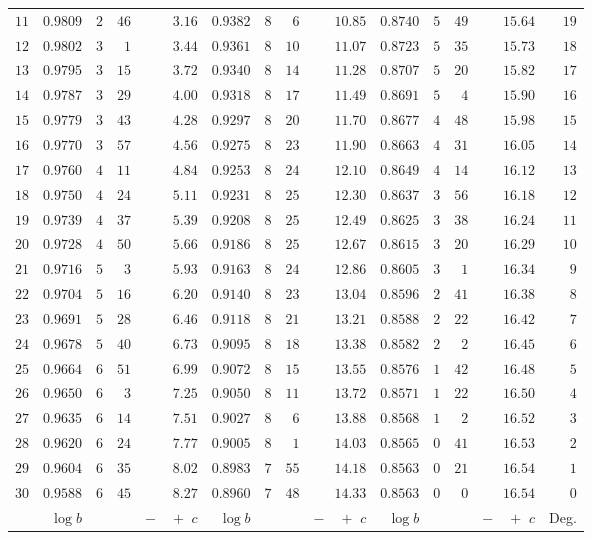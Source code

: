 \begin{center}
\begin{tabular}{r||r|rr|r||r|rr|r||r|rr|r||r}
$11$&$0.9809$&$2$&$46$&$3.16$&$0.9382$&$8$&$6$&$10.85$&$0.8740$&$5$&$49$&$15.64$&$19$\\
$12$&$0.9802$&$3$&$1$&$3.44$&$0.9361$&$8$&$10$&$11.07$&$0.8723$&$5$&$35$&$15.73$&$18$\\
$13$&$0.9795$&$3$&$15$&$3.72$&$0.9340$&$8$&$14$&$11.28$&$0.8707$&$5$&$20$&$15.82$&$17$\\
$14$&$0.9787$&$3$&$29$&$4.00$&$0.9318$&$8$&$17$&$11.49$&$0.8691$&$5$&$4$&$15.90$&$16$\\
$15$&$0.9779$&$3$&$43$&$4.28$&$0.9297$&$8$&$20$&$11.70$&$0.8677$&$4$&$48$&$15.98$&$15$\\[3pt]
$16$&$0.9770$&$3$&$57$&$4.56$&$0.9275$&$8$&$23$&$11.90$&$0.8663$&$4$&$31$&$16.05$&$14$\\
$17$&$0.9760$&$4$&$11$&$4.84$&$0.9253$&$8$&$24$&$12.10$&$0.8649$&$4$&$14$&$16.12$&$13$\\
$18$&$0.9750$&$4$&$24$&$5.11$&$0.9231$&$8$&$25$&$12.30$&$0.8637$&$3$&$56$&$16.18$&$12$\\
$19$&$0.9739$&$4$&$37$&$5.39$&$0.9208$&$8$&$25$&$12.49$&$0.8625$&$3$&$38$&$16.24$&$11$\\
$20$&$0.9728$&$4$&$50$&$5.66$&$0.9186$&$8$&$25$&$12.67$&$0.8615$&$3$&$20$&$16.29$&$10$\\[3pt]
$21$&$0.9716$&$5$&$3$&$5.93$&$0.9163$&$8$&$24$&$12.86$&$0.8605$&$3$&$1$&$16.34$&$9$\\
$22$&$0.9704$&$5$&$16$&$6.20$&$0.9140$&$8$&$23$&$13.04$&$0.8596$&$2$&$41$&$16.38$&$8$\\
$23$&$0.9691$&$5$&$28$&$6.46$&$0.9118$&$8$&$21$&$13.21$&$0.8588$&$2$&$22$&$16.42$&$7$\\
$24$&$0.9678$&$5$&$40$&$6.73$&$0.9095$&$8$&$18$&$13.38$&$0.8582$&$2$&$2$&$16.45$&$6$\\
$25$&$0.9664$&$6$&$51$&$6.99$&$0.9072$&$8$&$15$&$13.55$&$0.8576$&$1$&$42$&$16.48$&$5$\\[3pt]
$26$&$0.9650$&$6$&$3$&$7.25$&$0.9050$&$8$&$11$&$13.72$&$0.8571$&$1$&$22$&$16.50$&$4$\\
$27$&$0.9635$&$6$&$14$&$7.51$&$0.9027$&$8$&$6$&$13.88$&$0.8568$&$1$&$2$&$16.52$&$3$\\
$28$&$0.9620$&$6$&$24$&$7.77$&$0.9005$&$8$&$1$&$14.03$&$0.8565$&$0$&$41$&$16.53$&$2$\\
$29$&$0.9604$&$6$&$35$&$8.02$&$0.8983$&$7$&$55$&$14.18$&$0.8563$&$0$&$21$&$16.54$&$1$\\
$30$&$0.9588$&$6$&$45$&$8.27$&$0.8960$&$7$&$48$&$14.33$&$0.8563$&$0$&$0$&$16.54$&$0$\\
\hline
&$\log b$&&&$\log b$&&&$\log b$&&&Deg.\\

\end{tabular}
\end{center}
